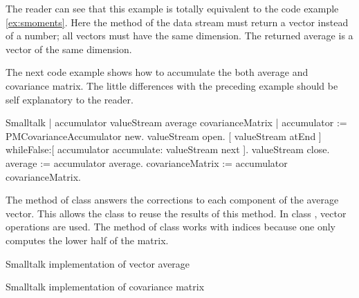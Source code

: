 The reader can see that this example is totally equivalent to the
code example \ref{ex:smoments}. Here the method  of the
data stream must return a vector instead of a number; all vectors
must have the same dimension. The returned average is a vector of
the same dimension.

The next code example shows how to accumulate the both average and
covariance matrix. The little differences with the preceding
example should be self explanatory to the reader.

\begin{listing}{Smalltalk}
  { }
 | accumulator valueStream average covarianceMatrix |
 accumulator := PMCovarianceAccumulator new.
 valueStream open.
 [ valueStream atEnd ]
        whileFalse:[ accumulator accumulate: valueStream next ].
 valueStream close.
 average := accumulator average.
 covarianceMatrix := accumulator covarianceMatrix.
\end{listing}

The method  of class 
answers the corrections to each component of the average vector.
This allows the class  to reuse the
results of this method. In class ,
vector operations are used. The method  of class
 works with indices because one only
computes the lower half of the matrix.

\begin{listing} Smalltalk implementation of vector average \label{ls:vectoraverage}

\end{listing}

\begin{listing} Smalltalk implementation of covariance matrix \label{ls:covmatrix}

\end{listing}


